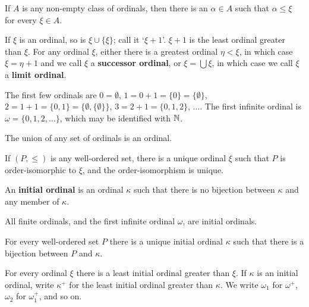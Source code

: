  If $A$ is any non-empty class of ordinals, then 
there is an $\alpha\in A$ such that $\alpha\le\xi$ for every 
$\xi\in A$.    
      
 If $\xi$ is an ordinal, so is $\xi\cup\{\xi\}$; 
call it `$\xi+1$'.     $\xi+1$ is 
the least ordinal greater than $\xi$.      For any ordinal $\xi$, either there is a greatest 
ordinal $\eta<\xi$, in which case $\xi=\eta+1$ and we call $\xi$ a {\bf 
successor ordinal}, or $\xi=\bigcup\xi$, in which case we call $\xi$ a 
{\bf limit ordinal}. 
      
 The first few ordinals are $0=\emptyset$, 
$1=0+1=\{0\}=\{\emptyset\}$, 
$2=1+1=\{0,1\}=\{\emptyset,\{\emptyset\}\}$, 
$3=2+1=\{0,1,2\}$, $\ldots$.   The first infinite ordinal is 
$\omega=\{0,1,2,\ldots\}$, which may be identified with $\Bbb N$. 
      
 The union of any set of ordinals is an ordinal. 
      
 If $(P,\le)$ is any well-ordered set, there is a 
unique ordinal $\xi$ such that $P$ is order-isomorphic to $\xi$, and the 
order-isomorphism is unique.    
      
 An {\bf initial ordinal} is an ordinal 
$\kappa$ such that there is no bijection between $\kappa$ and any member 
of $\kappa$.   
      
 All finite 
ordinals, and the first infinite ordinal $\omega$, are initial ordinals. 
      
 For every well-ordered set $P$ there is a unique 
initial ordinal $\kappa$ such that there is a bijection between $P$ and 
$\kappa$. 
      
 For every ordinal $\xi$ there is a least initial 
ordinal greater than $\xi$.      If 
$\kappa$ is an initial ordinal, write $\kappa^+$ for the least initial 
ordinal greater than $\kappa$.   We write $\omega_1$ for $\omega^+$, 
$\omega_2$ for $\omega_1^+$, and so on. 
      

